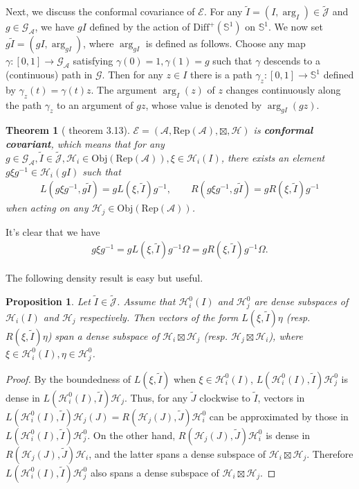 \documentclass[12pt,a4paper]{article}
\theoremstyle{definition}
\theoremstyle{plain}
\newtheorem{thm}[df]{Theorem}
\newtheorem{pp}[df]{Proposition}
\newcommand{\mc}{\mathcal}
\newcommand{\wtd}{\widetilde}
\newcommand{\Diffp}{\mathrm{Diff}^+}
\newcommand{\GA}{\mathscr G_{\mathcal A}}
\newcommand{\scr}{\mathscr}
\newcommand{\Jtd}{\widetilde{\mathcal J}}
\newcommand{\RepA}{\mathrm{Rep}(\mc A)}
\newcommand{\mbb}{\mathbb}
\newcommand{\Obj}{\mathrm{Obj}}
\numberwithin{equation}{subsection}
\begin{document}
Next, we discuss the conformal covariance of $\scr E$. For any $\wtd I=(I,\arg_I)\in\Jtd$ and $g\in\GA$, we have $gI$ defined by the action of $\Diffp(\mbb S^1)$ on $\mbb S^1$. We now set $g\wtd I=(gI,\arg_{gI})$, where $\arg_{gI}$ is defined as follows. Choose any map $\gamma:[0,1]\rightarrow\GA$ satisfying $\gamma(0)=1,\gamma(1)=g$ such that $\gamma$ descends to a (continuous) path in $\scr G$. Then for any $z\in I$ there is a path $\gamma_z:[0,1]\rightarrow \mbb S^1$ defined by $\gamma_z(t)=\gamma(t)z$. The argument $\arg_I(z)$ of $z$ changes continuously along the path $\gamma_z$ to an argument of $gz$, whose value is denoted by $\arg_{gI}(gz)$.  

\begin{thm}[\cite{Gui21a} theorem 3.13]
	$\scr E=(\mc A,\RepA,\boxtimes,\mc H)$ is \textbf{conformal covariant}, which means that for any $g\in\GA,\wtd I\in\wtd{\mc J},\mc H_i\in\Obj(\RepA),\xi\in\mc H_i(I)$, there exists an element $g\xi g^{-1}\in\mc H_i(g I)$ such that
	\begin{align}
	L(g\xi g^{-1},g\wtd I)=gL(\xi,\wtd I)g^{-1},\qquad R(g\xi g^{-1},g\wtd I)=gR(\xi,\wtd I)g^{-1}\label{eq15}
	\end{align}
	when acting on any $\mc H_j\in\Obj(\RepA)$.
\end{thm}
It's clear that we have
\begin{align}
g\xi g^{-1}=gL(\xi,\wtd I)g^{-1}\Omega=gR(\xi,\wtd I)g^{-1}\Omega.
\end{align}


The following density result is easy but useful.

\begin{pp}\label{lb2}
Let $\wtd I\in\Jtd$. Assume that  $\mc H_i^0(I)$ and $\mc H_j^0$ are dense subspaces of $\mc H_i(I)$ and $\mc H_j$ respectively. Then vectors of the form $L(\xi,\wtd I)\eta$ (resp. $R(\xi,\wtd I)\eta$)  span a dense subspace of $\mc H_i\boxtimes\mc H_j$ (resp. $\mc H_j\boxtimes\mc H_i$), where $\xi\in\mc H_i^0(I),\eta\in\mc H_j^0$.
\end{pp}
\begin{proof}
By the boundedness of $L(\xi,\wtd I)$ when $\xi\in\mc H_i^0(I)$, $L(\mc H_i^0(I),\wtd I)\mc H_j^0$ is dense in 	$L(\mc H_i^0(I),\wtd I)\mc H_j$. Thus, for any $\wtd J$ clockwise to $\wtd I$, vectors in $L(\mc H_i^0(I),\wtd I)\mc H_j(J)=R(\mc H_j(J),\wtd J)\mc H_i^0$ can be approximated by those in $L(\mc H_i^0(I),\wtd I)\mc H_j^0$. On the other hand, $R(\mc H_j(J),\wtd J)\mc H_i^0$ is dense in $R(\mc H_j(J),\wtd J)\mc H_i$, and the latter spans a dense subspace of $\mc H_i\boxtimes\mc H_j$. Therefore $L(\mc H_i^0(I),\wtd I)\mc H_j^0$ also spans a dense subspace of $\mc H_i\boxtimes\mc H_j$.
\end{proof}
\end{document}
